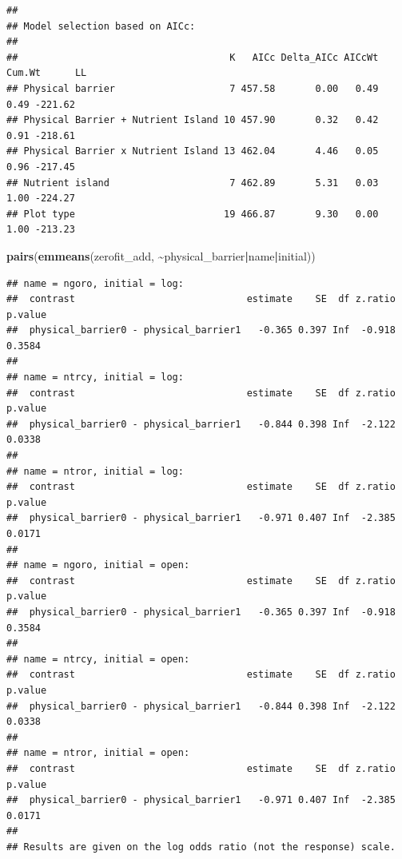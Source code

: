 \documentclass[
]{article}
\newenvironment{Shaded}{\begin{snugshade}}{\end{snugshade}}
\newcommand{\FunctionTok}[1]{\textcolor[rgb]{0.13,0.29,0.53}{\textbf{#1}}}
\newcommand{\NormalTok}[1]{#1}
\newcommand{\SpecialCharTok}[1]{\textcolor[rgb]{0.81,0.36,0.00}{\textbf{#1}}}
\begin{document}
\begin{verbatim}
## 
## Model selection based on AICc:
## 
##                                     K   AICc Delta_AICc AICcWt Cum.Wt      LL
## Physical barrier                    7 457.58       0.00   0.49   0.49 -221.62
## Physical Barrier + Nutrient Island 10 457.90       0.32   0.42   0.91 -218.61
## Physical Barrier x Nutrient Island 13 462.04       4.46   0.05   0.96 -217.45
## Nutrient island                     7 462.89       5.31   0.03   1.00 -224.27
## Plot type                          19 466.87       9.30   0.00   1.00 -213.23
\end{verbatim}

\begin{Shaded}
\begin{Highlighting}[]
\FunctionTok{pairs}\NormalTok{(}\FunctionTok{emmeans}\NormalTok{(zerofit\_add, }\SpecialCharTok{\textasciitilde{}}\NormalTok{physical\_barrier}\SpecialCharTok{|}\NormalTok{name}\SpecialCharTok{|}\NormalTok{initial))}
\end{Highlighting}
\end{Shaded}

\begin{verbatim}
## name = ngoro, initial = log:
##  contrast                              estimate    SE  df z.ratio p.value
##  physical_barrier0 - physical_barrier1   -0.365 0.397 Inf  -0.918  0.3584
## 
## name = ntrcy, initial = log:
##  contrast                              estimate    SE  df z.ratio p.value
##  physical_barrier0 - physical_barrier1   -0.844 0.398 Inf  -2.122  0.0338
## 
## name = ntror, initial = log:
##  contrast                              estimate    SE  df z.ratio p.value
##  physical_barrier0 - physical_barrier1   -0.971 0.407 Inf  -2.385  0.0171
## 
## name = ngoro, initial = open:
##  contrast                              estimate    SE  df z.ratio p.value
##  physical_barrier0 - physical_barrier1   -0.365 0.397 Inf  -0.918  0.3584
## 
## name = ntrcy, initial = open:
##  contrast                              estimate    SE  df z.ratio p.value
##  physical_barrier0 - physical_barrier1   -0.844 0.398 Inf  -2.122  0.0338
## 
## name = ntror, initial = open:
##  contrast                              estimate    SE  df z.ratio p.value
##  physical_barrier0 - physical_barrier1   -0.971 0.407 Inf  -2.385  0.0171
## 
## Results are given on the log odds ratio (not the response) scale.
\end{verbatim}
\end{document}
